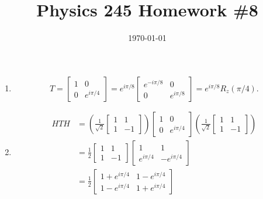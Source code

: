 \documentclass{article}
\date{\today}
\title{Physics 245 Homework \#8}
\begin{document}
\maketitle

\begin{prob}
\end{prob}
\begin{enumerate}[label=(\alph*)]
    \item
        \[ T = \begin{bmatrix}
            1 & 0 \\
            0 & e^{i\pi/4}
        \end{bmatrix} = e^{i\pi/8} \begin{bmatrix}
            e^{-i\pi/8} & 0 \\
            0 & e^{i\pi/8}
        \end{bmatrix} = e^{i\pi/8} R_z(\pi/4). \]
    \item \begin{align*}
            HTH &= \left( \frac{1}{\sqrt{2}} \begin{bmatrix}
                    1 & 1 \\
                    1 & -1
            \end{bmatrix} \right) \begin{bmatrix}
                    1 & 0 \\
                    0 & e^{i\pi/4}
                \end{bmatrix} \left( \frac{1}{\sqrt{2}} \begin{bmatrix}
                    1 & 1 \\
                    1 & -1
                \end{bmatrix} \right) \\
                &= \frac{1}{2} \begin{bmatrix}
                        1 & 1 \\
                        1 & -1
                \end{bmatrix} \begin{bmatrix}
                        1 & 1 \\
                        e^{i\pi/4} & -e^{i\pi/4}
                \end{bmatrix} \\
                &= \frac{1}{2} \begin{bmatrix}
                    1+e^{i\pi/4} & 1-e^{i\pi/4} \\
                    1-e^{i\pi/4} & 1+e^{i\pi/4}

\end{bmatrix}
\end{align*}
\end{enumerate}
\end{document}
